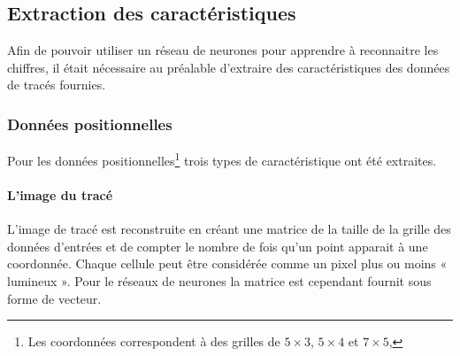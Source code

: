 \subsection{Extraction des caractéristiques}

Afin de pouvoir utiliser un réseau de neurones pour apprendre à reconnaitre les chiffres, il était nécessaire au préalable d'extraire des caractéristiques des données de tracés fournies.

\subsubsection{Données positionnelles} Pour les données positionnelles\footnote{Les coordonnées correspondent à des grilles de $5 \times 3$, $5 \times 4$ et $7 \times 5$,} trois types de caractéristique ont été extraites.

\paragraph{L'image du tracé} L'image de tracé est reconstruite en créant une matrice de la taille de la grille des données d'entrées et de compter le nombre de fois qu'un point apparait à une coordonnée. Chaque cellule peut être considérée comme un pixel plus ou moins « lumineux ». Pour le réseaux de neurones la matrice est cependant fournit sous forme de vecteur.

